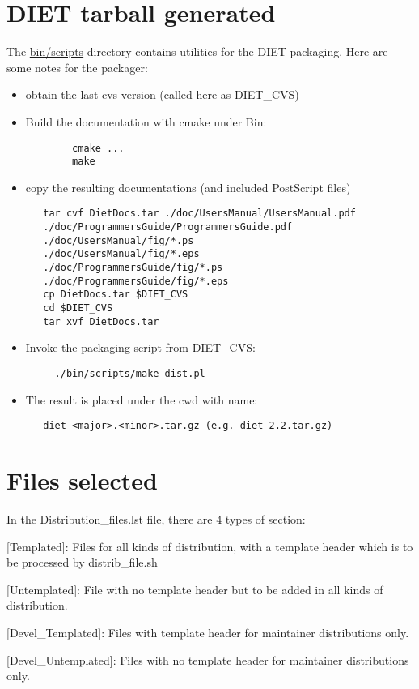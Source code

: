 
\section{DIET tarball generated}

The \url{bin/scripts} directory contains utilities for the DIET packaging. Here are some notes for the packager:

\begin{itemize} 
\item obtain the last cvs version (called here as DIET\_CVS)
\item Build the documentation with cmake under Bin:
\begin{verbatim}
        cmake ...
        make
\end{verbatim}
\item copy the resulting documentations (and included PostScript files)
\begin{verbatim}
   tar cvf DietDocs.tar ./doc/UsersManual/UsersManual.pdf 
   ./doc/ProgrammersGuide/ProgrammersGuide.pdf 
   ./doc/UsersManual/fig/*.ps      
   ./doc/UsersManual/fig/*.eps     
   ./doc/ProgrammersGuide/fig/*.ps 
   ./doc/ProgrammersGuide/fig/*.eps
   cp DietDocs.tar $DIET_CVS
   cd $DIET_CVS
   tar xvf DietDocs.tar
\end{verbatim}

\item Invoke the packaging script from DIET\_CVS:
\begin{verbatim}
     ./bin/scripts/make_dist.pl
\end{verbatim}
\item The result is placed under the cwd with name:
\begin{verbatim}
   diet-<major>.<minor>.tar.gz (e.g. diet-2.2.tar.gz)
\end{verbatim}
\end{itemize} 

\section{Files selected}

In the Distribution\_files.lst file, there are 4 types of section:

\begin{description}
\item{[Templated]:} Files for all kinds of distribution, with a template header which is to be processed by distrib\_file.sh
\item{[Untemplated]:} File with no template header but to be added in all kinds of distribution.                         
\item{[Devel\_Templated]:} Files with template header for maintainer distributions only.                                            
\item{[Devel\_Untemplated]:} Files with no template header for maintainer distributions only.       
\end{description}
